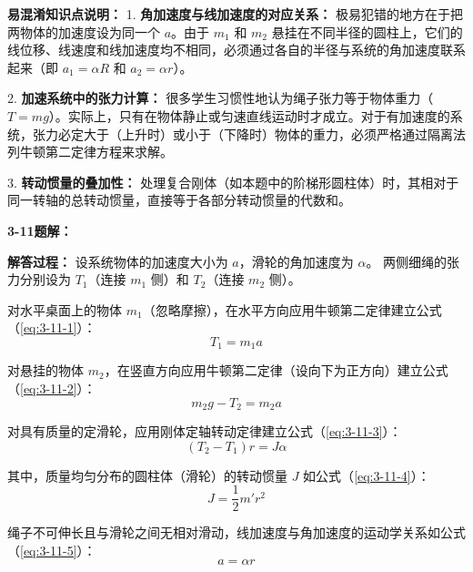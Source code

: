 \vspace{1em}

\textbf{易混淆知识点说明：}
1. \textbf{角加速度与线加速度的对应关系：} 极易犯错的地方在于把两物体的加速度设为同一个 $a$。由于 $m_1$ 和 $m_2$ 悬挂在不同半径的圆柱上，它们的线位移、线速度和线加速度均不相同，必须通过各自的半径与系统的角加速度联系起来（即 $a_1 = \alpha R$ 和 $a_2 = \alpha r$）。

2. \textbf{加速系统中的张力计算：} 很多学生习惯性地认为绳子张力等于物体重力（$T=mg$）。实际上，只有在物体静止或匀速直线运动时才成立。对于有加速度的系统，张力必定大于（上升时）或小于（下降时）物体的重力，必须严格通过隔离法列牛顿第二定律方程来求解。

3. \textbf{转动惯量的叠加性：} 处理复合刚体（如本题中的阶梯形圆柱体）时，其相对于同一转轴的总转动惯量，直接等于各部分转动惯量的代数和。

\vspace{2em}

\textbf{3-11题解：}
\setcounter{equation}{0}
\renewcommand{\theHequation}{3-11.\arabic{equation}}

\textbf{解答过程：}
设系统物体的加速度大小为 $a$，滑轮的角加速度为 $\alpha$。
两侧细绳的张力分别设为 $T_1$（连接 $m_1$ 侧）和 $T_2$（连接 $m_2$ 侧）。

对水平桌面上的物体 $m_1$（忽略摩擦），在水平方向应用牛顿第二定律建立公式（\ref{eq:3-11-1}）：
\begin{equation}\label{eq:3-11-1}
	T_1 = m_1 a
\end{equation}

对悬挂的物体 $m_2$，在竖直方向应用牛顿第二定律（设向下为正方向）建立公式（\ref{eq:3-11-2}）：
\begin{equation}\label{eq:3-11-2}
	m_2 g - T_2 = m_2 a
\end{equation}

对具有质量的定滑轮，应用刚体定轴转动定律建立公式（\ref{eq:3-11-3}）：
\begin{equation}\label{eq:3-11-3}
	(T_2 - T_1)r = J\alpha
\end{equation}

其中，质量均匀分布的圆柱体（滑轮）的转动惯量 $J$ 如公式（\ref{eq:3-11-4}）：
\begin{equation}\label{eq:3-11-4}
	J = \frac{1}{2}m'r^2
\end{equation}

绳子不可伸长且与滑轮之间无相对滑动，线加速度与角加速度的运动学关系如公式（\ref{eq:3-11-5}）：
\begin{equation}\label{eq:3-11-5}
	a = \alpha r
\end{equation}

